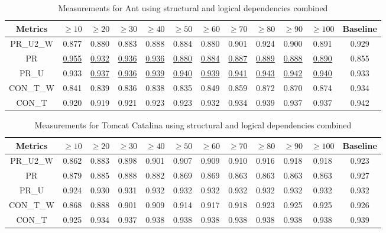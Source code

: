 \documentclass[runningheads]{comsis2}
\begin{document}
\begin{table}[!h]
\setlength\tabcolsep{3.5pt}
\caption{Measurements for Ant using structural and logical dependencies combined}
\label{tab:measurementscombined:ant}
\centering
\begin{tabular}{|c|cccccccccc|c|}
\hline
Metrics &	$\geq10$	&	$\geq20$		&	$\geq30$		&	$\geq40$		&	$\geq50$		&	$\geq60$		&	$\geq70$		&	$\geq80$		&	$\geq90$		&	$\geq100$		&	Baseline \\
\hline

PR\_U2\_W	&	0.877	&	0.880	&	0.883	&	0.888	&	0.884	&	0.880	&	0.901	&	0.924	&	0.900	&	0.891	&	0.929	\\
PR	&	\underline{0.955}	&	\underline{0.932}	&	\underline{0.936}	&	\underline{0.936}	&	\underline{0.880}	&	\underline{0.884}	&	\underline{0.887}	&	\underline{0.889}	&	\underline{0.888}	&	\underline{0.890}	&	0.855	\\
PR\_U	&	0.933	&	\underline{0.937}	&	\underline{0.936}	&	\underline{0.939}	&	\underline{0.940}	&	\underline{0.939}	&	\underline{0.941}	&	\underline{0.943}	&	\underline{0.942}	&	\underline{0.940}	&	0.933	\\
CON\_T\_W	&	0.841	&	0.839	&	0.836	&	0.838	&	0.835	&	0.849	&	0.859	&	0.872	&	0.870	&	0.874	&	0.934	\\
CON\_T	&	0.920	&	0.919	&	0.921	&	0.923	&	0.923	&	0.932	&	0.934	&	0.939	&	0.937	&	0.937	&	0.942	\\

\hline
\end{tabular}
\end{table}


\begin{table}[!h]
\setlength\tabcolsep{3.5pt}
\caption{Measurements for Tomcat Catalina using structural and logical dependencies combined}
\label{tab:measurementscombined:tomcat}
\centering
\begin{tabular}{|c|cccccccccc|c|}
\hline
Metrics &	$\geq10$	&	$\geq20$		&	$\geq30$		&	$\geq40$		&	$\geq50$		&	$\geq60$		&	$\geq70$		&	$\geq80$		&	$\geq90$		&	$\geq100$		&	Baseline \\
\hline

PR\_U2\_W	&	0.862	&	0.883	&	0.898	&	0.901	&	0.907	&	0.909	&	0.910	&	0.916	&	0.918	&	0.918	&	0.923	\\
PR	&	0.879	&	0.885	&	0.888	&	0.882	&	0.869	&	0.869	&	0.863	&	0.863	&	0.863	&	0.863	&	0.927	\\
PR\_U	&	0.924	&	0.930	&	0.931	&	0.932	&	0.932	&	0.932	&	0.932	&	0.932	&	0.932	&	0.932	&	0.932	\\
CON\_T\_W	&	0.868	&	0.888	&	0.901	&	0.909	&	0.914	&	0.917	&	0.918	&	0.923	&	0.925	&	0.925	&	0.926	\\
CON\_T	&	0.925	&	0.934	&	0.937	&	0.938	&	0.938	&	0.938	&	0.938	&	0.938	&	0.938	&	0.938	&	0.939	\\
																										

\hline
\end{tabular}
\end{table}
\end{document}
